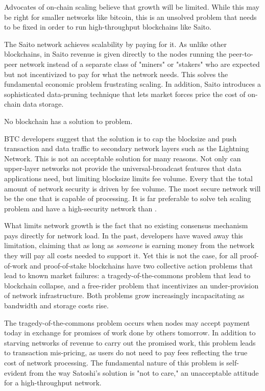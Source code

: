 \documentclass[11.5pt, oneside]{article}   	%
\begin{document}
\begin{multicols}{2}
Advocates of on-chain scaling believe that growth will be limited. While this may be right for smaller networks like bitcoin, this is an unsolved problem that needs to be fixed in order to run high-throughput blockchains like Saito.


The Saito network achieves scalability by paying for it. As unlike other blockchains, in Saito revenue is given directly to the nodes running the peer-to-peer network instead of a separate class of "miners" or "stakers" who are expected but not incentivized to pay for what the network needs. This solves the fundamental economic problem frustrating scaling. In addition, Saito introduces a sophisticated data-pruning technique that lets market forces price the cost of on-chain data storage.





No blockchain has a solution to problem.

BTC developers suggest that the solution is to cap the blocksize and push transaction and data traffic to secondary network layers such as the Lightning Network. This is not an acceptable solution for many reasons. Not only can upper-layer networks not provide the universal-broadcast features that data applications need, but limiting blocksize limits fee volume. Every  that the total amount of network security is driven by fee volume. The most secure network will be the one that is capable of processing. It is far preferable to solve teh scaling problem and have a high-security network than .







What limits network growth is the fact that no existing consensus mechanism pays directly for network load. In the past, developers have waved away this limitation, claiming that as long as {\textit{someone}} is earning money from the network they will pay all costs needed to support it. Yet this is not the case, for all proof-of-work and proof-of-stake blockchains have two collective action problems that lead to known market failures: a tragedy-of-the-commons problem that lead to blockchain collapse, and a free-rider problem that incentivizes an under-provision of network infrastructure. Both problems grow increasingly incapacitating as bandwidth and storage costs rise.

The tragedy-of-the-commons problem occurs when nodes may accept payment today in exchange for promises of work done by others tomorrow. In addition to starving networks of revenue to carry out the promised work, this problem leads to transaction mis-pricing, as users do not need to pay fees reflecting the true cost of network processing. The fundamental nature of this problem is self-evident from the way Satoshi's solution is "not to care," an unacceptable attitude for a high-throughput network.


\end{multicols}
\end{document}
